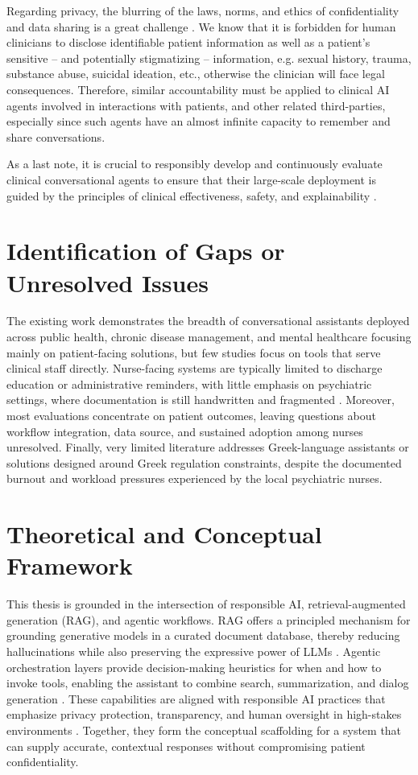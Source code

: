 Regarding privacy, the blurring of the laws, norms, and ethics of confidentiality and data sharing is a great challenge \cite{aipsychotherapy2019}. We know that it is forbidden for human clinicians to disclose identifiable patient information as well as a patient's sensitive -- and potentially stigmatizing -- information, e.g. sexual history, trauma, substance abuse, suicidal ideation, etc., otherwise the clinician will face legal consequences. Therefore, similar accountability must be applied to clinical AI agents involved in interactions with patients, and other related third-parties, especially since such agents have an almost infinite capacity to remember and share conversations. 

As a last note, it is crucial to responsibly develop and continuously evaluate clinical conversational agents to ensure that their large-scale deployment is guided by the principles of clinical effectiveness, safety, and explainability \cite{chaGPTpassesUSMLE2023, stade2024}.

\section{Identification of Gaps or Unresolved Issues}
The existing work demonstrates the breadth of conversational assistants deployed across public health, chronic disease management, and mental healthcare focusing mainly on patient-facing solutions, but few studies focus on tools that serve clinical staff directly. Nurse-facing systems are typically limited to discharge education or administrative reminders, with little emphasis on psychiatric settings, where documentation is still handwritten and fragmented \cite{bickmoreetalrealtionalfordepression2010}. Moreover, most evaluations concentrate on patient outcomes, leaving questions about workflow integration, data source, and sustained adoption among nurses unresolved. Finally, very limited literature addresses Greek-language assistants or solutions designed around Greek regulation constraints, despite the documented burnout and workload pressures experienced by the local psychiatric nurses.

\section{Theoretical and Conceptual Framework}
This thesis is grounded in the intersection of responsible AI, retrieval-augmented generation (RAG), and agentic workflows. RAG offers a principled mechanism for grounding generative models in a curated document database, thereby reducing hallucinations while also preserving the expressive power of LLMs \cite{raglewisetal2021}. Agentic orchestration layers provide decision-making heuristics for when and how to invoke tools, enabling the assistant to combine search, summarization, and dialog generation \cite{clinicalentityIE2025}. These capabilities are aligned with responsible AI practices that emphasize privacy protection, transparency, and human oversight in high-stakes environments \cite{opportunitiesrisks2024}. Together, they form the conceptual scaffolding for a system that can supply accurate, contextual responses without compromising patient confidentiality.

